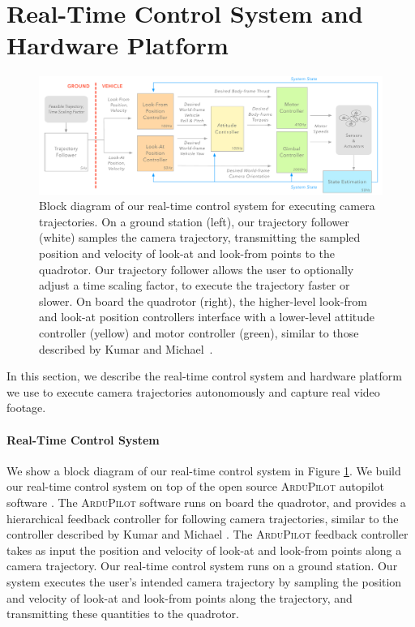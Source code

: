 \section{Real-Time Control System and Hardware Platform}
\label{sec:ch2:hw}

\begin{figure}[t]
\centering
\includegraphics[width=6.0in]{images/2015_siggraph_asia/ControlAlgorithm}
\caption{
Block diagram of our real-time control system for executing camera trajectories.
On a ground station (left), our trajectory follower (white) samples the camera trajectory, transmitting the sampled position and velocity of look-at and look-from points to the quadrotor.
Our trajectory follower allows the user to optionally adjust a time scaling factor, to execute the trajectory faster or slower.
On board the quadrotor (right), the higher-level look-from and look-at position controllers interface with a lower-level attitude controller (yellow) and motor controller (green), similar to those described by Kumar and Michael~\protect{}.
}
\label{fig:ch2:controlsystem}
\end{figure}

In this section, we describe the real-time control system and hardware platform we use to execute camera trajectories autonomously and capture real video footage.

\paragraph{Real-Time Control System}
We show a block diagram of our real-time control system in Figure \ref{fig:ch2:controlsystem}.
We build our real-time control system on top of the open source \textsc{ArduPilot} autopilot software \cite{apm:2015}. 
The \textsc{ArduPilot} software runs on board the quadrotor, and provides a hierarchical feedback controller for following camera trajectories, similar to the controller described by Kumar and Michael . 
The \textsc{ArduPilot} feedback controller takes as input the position and velocity of look-at and look-from points along a camera trajectory.
Our real-time control system runs on a ground station.
Our system executes the user's intended camera trajectory by sampling the position and velocity of look-at and look-from points along the trajectory, and transmitting these quantities to the quadrotor.

